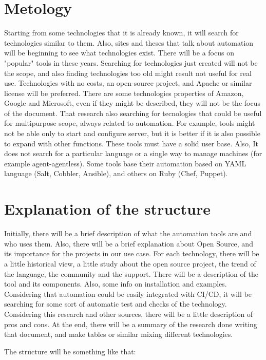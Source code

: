 \documentclass[12pt,a4paper,openright,twoside]{book}
\begin{document}
\section{Metology}
Starting from some technologies that it is already known, it will search for technologies similar to them.
Also, sites and theses that talk about automation will be beginning to see what technologies exist.
There will be a focus on "popular" tools in these years. Searching for technologies just created will not be the scope, and also finding technologies too old might result not useful for real use.
Technologies with no costs, an open-source project, and Apache or similar license will be preferred.
There are some technologies properties of Amazon, Google and Microsoft, even if they might be described, they will not be the focus of the document.
That research also searching for tecnologies that could be useful for multipurpose scope, always related to automation.
For example, tools might not be able only to start and configure server, but it is better if it is also possible to expand with other functions.
These tools must have a solid user base. Also, It does not search for a particular language or a single way to manage machines (for example agent-agentless).
Some tools base their automation based on YAML language (Salt, Cobbler, Ansible), and others on Ruby (Chef, Puppet).

\section{Explanation of the structure}

Initially, there will be a brief description of what the automation tools are and who uses them.
Also, there will be a brief explanation about Open Source, and its importance for the projects in our use case.
For each technology, there will be a little historical view, a little study about the open source project, the trend of the language, the community and the support.
There will be a description of the tool and its components.
Also, some info on installation and examples.
Considering that automation could be easily integrated with CI/CD, it will be searching for some sort of automatic test and checks of the technology.
Considering this research and other sources, there will be a little description of pros and cons.
At the end, there will be a summary of the research done writing that document, and make tables or similar mixing different technologies.

The structure will be something like that:
\end{document}
